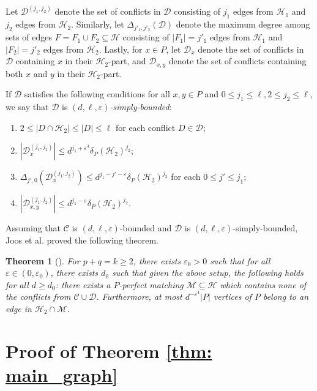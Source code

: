 \documentclass{article}
\newtheorem{theorem}{Theorem}
\theoremstyle{definition}
\newcommand\cH{{\mathcal H}}
\newcommand\cC{{\mathcal C}}
\newcommand{\cD}{\mathcal{D}}
\newcommand\cM{{\mathcal M}}
\begin{document}
Let $\cD^{(j_1, j_2)}$ denote the set of conflicts in $\cD$ consisting of $j_1$ edges from $\cH_1$ and $j_2$ edges from $\cH_2$.  Similarly, let $\Delta_{j'_1, j'_2}(\cD)$ denote the maximum degree among sets of edges $F = F_1 \cup F_2 \subseteq \cH$ consisting of $|F_1| = j'_1$ edges from $\cH_1$ and $|F_2| = j'_2$ edges from $\cH_2$.  Lastly, for $x \in P$, let $\cD_x$ denote the set of conflicts in $\cD$ containing $x$ in their $\cH_2$-part, and $\cD_{x,y}$ denote the set of conflicts containing both $x$ and $y$ in their $\cH_2$-part.

If $\cD$ satisfies the following  conditions for all $x,y \in P$ and $0 \leq j_1 \leq \ell, 2 \leq j_2 \leq \ell$, we say that $\cD$ is \emph{$(d, \ell, \varepsilon)$-simply-bounded}:
\begin{enumerate}[label=(D\arabic*)]
    \item \label{D1} $2 \leq |D \cap \cH_2| \leq |D| \leq \ell$ for each conflict $D \in \cD$;
    \item \label{D2} $|\cD_x^{(j_1,j_2)}| \leq d^{j_1 + \varepsilon^4} \delta_P(\cH_2)^{j_2}$; 
    \item \label{D3} $\Delta_{j',0}(\cD_x^{(j_1,j_2)}) \leq d^{j_1 - j' - \varepsilon} \delta_P(\cH_2)^{j_2}$ for each $0 \leq j' \leq j_1$;
    \item \label{D4} $|\cD_{x,y}^{(j_1,j_2)}| \leq d^{j_1 - \varepsilon} \delta_P(\cH_2)^{j_2}$.
\end{enumerate}

Assuming that $\mathcal{C}$ is $(d,\ell,\varepsilon)$-bounded and $\mathcal{D}$ is $(d,\ell,\varepsilon)$-simply-bounded, Joos et al. proved the following theorem.



\begin{theorem}[\cite{JMS}] \label{thm:blackbox}
    For $p + q = k \geq 2$, there exists $\varepsilon_0 > 0$ such that for all $\varepsilon \in (0, \varepsilon_0)$, there exists $d_0$ such that given the above setup, the following holds for all $d \geq d_0$: there exists a $P$-perfect matching $\cM \subseteq \cH$ which contains none of the conflicts from $\cC \cup \cD$.  Furthermore, at most $d^{-\varepsilon^4} |P|$ vertices of $P$ belong to an edge in $\cH_2 \cap \cM$.  
\end{theorem}





\section{Proof of Theorem \ref{thm: main_graph}} \label{sec:pmain}
\end{document}
